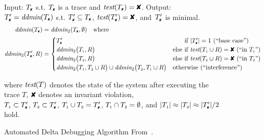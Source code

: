 \begin{figure}[t]
\footnotesize
\begin{boxedminipage}{\textwidth}
Input: $\cfail$ s.t. $\cfail$ is a trace and $\test(\cfail) = \DFAIL$. Output: $\dfail
= \ddmin(\cfail)$ s.t. $\dfail \subseteq
\cfail$, $\test(\dfail) = \DFAIL$, and~$\dfail$ is minimal.
\begin{align*}
\ddmin(\cfail) &= \ddmin_2(\cfail, \emptyset) \quad \text{where} \\
\ddmin_2(\dfail, R) &=
\begin{cases}
\dfail & \text{\hphantom{else }if $|\dfail| = 1$ (``base case'')} \\
\ddmin_2\bigl(\done, R\bigr) &
\text{else if $\test(\done \cup R) = \DFAIL$ (``in $\done$'')} \\
\ddmin_2\bigl(\dtwo, R\bigr) &
\text{else if $\test(\dtwo \cup R) = \DFAIL$ (``in $\dtwo$'')} \\
\ddmin_2\bigl(\done, \dtwo \cup R\bigr) \cup \ddmin_2\bigl(\dtwo, \done \cup
R\bigr) & \text{otherwise (``interference'')}
\end{cases}
\end{align*}
\begin{center}
where $\textit{test}(T)$ denotes the state of the system after executing the trace $T$,
$\DFAIL$ denotes an invariant violation, \\
$\done \subset \dfail$, $\dtwo \subset \dfail$, $\done \cup \dtwo = \dfail$, ${T_{\scriptscriptstyle 1}} \cap
{T_{\scriptscriptstyle 2}} = \emptyset$, and $|\done| \approx |\dtwo| \approx |\dfail| / 2$
hold.
\end{center}
\end{boxedminipage}
\caption{ Automated Delta Debugging Algorithm
From~\cite{Zeller:1999:YMP:318773.318946}.}
\label{fig:ddmin}
\vspace{-0.3cm}
\end{figure}

